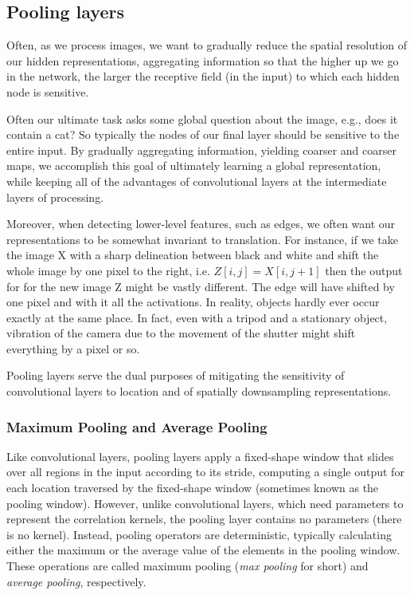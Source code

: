 \subsection{Pooling layers}\label{subsec:pool_layers}

Often, as we process images, we want to gradually reduce the spatial resolution of our hidden representations, aggregating information so that the higher up we go in the network, the larger the receptive field (in the input) to which each hidden node is sensitive.

Often our ultimate task asks some global question about the image, e.g., does it contain a cat? So typically the nodes of our final layer should be sensitive to the entire input. By gradually aggregating information, yielding coarser and coarser maps, we accomplish this goal of ultimately learning a global representation, while keeping all of the advantages of convolutional layers at the intermediate layers of processing.

Moreover, when detecting lower-level features, such as edges, we often want our representations to be somewhat invariant to translation. For instance, if we take the image X with a sharp delineation between black and white and shift the whole image by one pixel to the right, i.e. $Z[i,j] = X[i,j+1]$ then the output for for the new image Z might be vastly different. The edge will have shifted by one pixel and with it all the activations. In reality, objects hardly ever occur exactly at the same place. In fact, even with a tripod and a stationary object, vibration of the camera due to the movement of the shutter might shift everything by a pixel or so.

Pooling layers serve the dual purposes of mitigating the sensitivity of convolutional layers to location and of spatially downsampling representations.

\subsubsection{Maximum Pooling and Average Pooling}

Like convolutional layers, pooling layers apply a fixed-shape window that slides over all regions in the input according to its stride, computing a single output for each location traversed by the fixed-shape window (sometimes known as the pooling window). However, unlike convolutional layers, which need parameters to represent the correlation kernels, the pooling layer contains no parameters (there is no kernel). Instead, pooling operators are deterministic, typically calculating either the maximum or the average value of the elements in the pooling window. These operations are called maximum pooling (\textit{max pooling} for short) and \textit{average pooling}, respectively.

